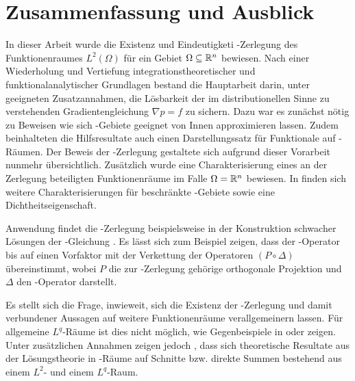 \chapter{Zusammenfassung und Ausblick}

In dieser Arbeit wurde die Existenz und Eindeutigketi \helmholtz\hyp{}Zerlegung des Funktionenraumes $L^2(\Omega)$ für ein Gebiet $\Omega \subseteq \mathbb{R}^n$ bewiesen.
Nach einer Wiederholung und Vertiefung integrationstheoretischer und funktionalanalytischer Grundlagen bestand die Hauptarbeit darin, unter geeigneten Zusatzannahmen, die Lösbarkeit der im distributionellen Sinne zu verstehenden Gradientengleichung $\nabla p = f$ zu sichern.
Dazu war es zunächst nötig zu Beweisen wie sich \lipschitz\hyp{}Gebiete geeignet von Innen approximieren lassen.
Zudem beinhalteten die Hilfsresultate auch einen Darstellungssatz für Funktionale auf \sobolev\hyp{}Räumen.
Der Beweis der \helmholtz\hyp{}Zerlegung gestaltete sich aufgrund dieser Vorarbeit nunmehr übersichtlich.
Zusätzlich wurde eine Charakterisierung eines an der Zerlegung beteiligten Funktionenräume im Falle $\Omega = \mathbb{R}^n$ bewiesen.
In \cite[S.81ff., II.2.5]{sohr2001navier} finden sich weitere Charakterisierungen für beschränkte \lipschitz\hyp{}Gebiete sowie eine Dichtheitseigenschaft.

Anwendung findet die \helmholtz\hyp{}Zerlegung beispielsweise in der Konstruktion schwacher Lösungen der \stokes\hyp{}Gleichung \cite[S.129f.]{sohr2001navier}. 
Es lässt sich zum Beispiel zeigen, dass der \stokes\hyp{}Operator bis auf einen Vorfaktor mit der Verkettung der Operatoren $(P \circ \Delta)$ übereinstimmt, wobei $P$ die zur \helmholtz\hyp{}Zerlegung gehörige orthogonale Projektion und $\Delta$ den \laplace\hyp{}Operator darstellt.

Es stellt sich die Frage, inwieweit, sich die Existenz der \helmholtz\hyp{}Zerlegung und damit verbundener Aussagen auf weitere Funktionenräume verallgemeinern lassen.
Für allgemeine $L^q$\hyp{}Räume ist dies nicht möglich, wie Gegenbeispiele in \cite{maslennikova1986elliptic} oder \cite{bogovski1986decomposition} zeigen.
Unter zusätzlichen Annahmen zeigen jedoch \cite{farwig05thehelmholtz,farwig05anLq}, dass sich theoretische Resultate aus der Lösungstheorie in \hilbert\hyp{}Räume auf Schnitte bzw. direkte Summen bestehend aus einem $L^2$- und einem $L^q$\hyp{}Raum.

    
